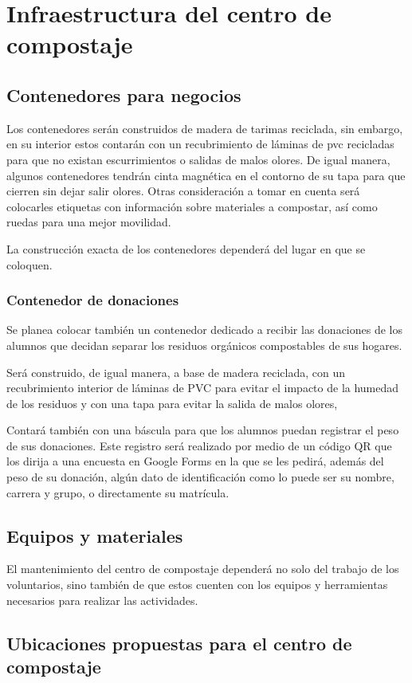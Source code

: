 \section{Infraestructura del centro de compostaje}

\subsection{Contenedores para negocios}

Los contenedores serán construidos de madera de tarimas reciclada, sin embargo, en su interior estos contarán con un recubrimiento de láminas de pvc recicladas para que no existan escurrimientos o salidas de malos olores. De igual manera, algunos contenedores tendrán cinta magnética en el contorno de su tapa para que cierren sin dejar salir olores. Otras consideración a tomar en cuenta será colocarles etiquetas con información sobre materiales a compostar, así como ruedas para una mejor movilidad.

La construcción exacta de los contenedores dependerá del lugar en que se coloquen.

\subsubsection{Contenedor de donaciones}

Se planea colocar también un contenedor dedicado a recibir las donaciones de los alumnos que decidan separar los residuos orgánicos compostables de sus hogares.

Será construido, de igual manera, a base de madera reciclada, con un recubrimiento interior de láminas de PVC para evitar el impacto de la humedad de los residuos y con una tapa para evitar la salida de malos olores,

Contará también con una báscula para que los alumnos puedan registrar el peso de sus donaciones. Este registro será realizado por medio de un código QR que los dirija a una  encuesta en Google Forms en la que se les pedirá, además del peso de su donación, algún dato de identificación como lo puede ser su nombre, carrera y grupo, o directamente su matrícula.

\subsection{Equipos y materiales}

El mantenimiento del centro de compostaje dependerá no solo del trabajo de los voluntarios, sino también de que estos cuenten con los equipos  y herramientas necesarios para realizar las actividades.

    
\subsection{Ubicaciones propuestas para el centro de compostaje}

    
